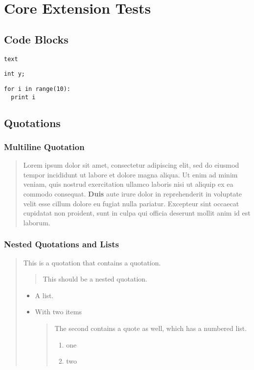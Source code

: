 
\chapter{\label{core-extension-tests}Core Extension Tests}
\section{\label{code-blocks}Code Blocks}
\begin{verbatim}
text
\end{verbatim}
\begin{verbatim}
int y;
\end{verbatim}
\begin{verbatim}
for i in range(10):
  print i
\end{verbatim}
\section{\label{quotations}Quotations}
\subsection{\label{multiline-quotation}Multiline Quotation}
\begin{quote}
\par Lorem ipsum dolor sit amet, consectetur adipiscing elit, sed do eiusmod tempor incididunt ut labore et dolore magna aliqua. Ut enim ad minim veniam, quis nostrud exercitation ullamco laboris nisi ut aliquip ex ea commodo consequat. \textbf{Duis} aute irure dolor in reprehenderit in voluptate velit esse cillum dolore eu fugiat nulla pariatur. Excepteur sint occaecat cupidatat non proident, sunt in culpa qui officia deserunt mollit anim id est laborum.
\end{quote}
\subsection{\label{nested-quotations-and-lists}Nested Quotations and Lists}
\begin{quote}
\par This is a quotation that contains a quotation.
\begin{quote}
\par This should be a nested quotation.
\end{quote}
\begin{itemize}
\item
\par A list. \item
\par With two items
\begin{quote}
\par The second contains a quote as well, which has a numbered list.
\begin{enumerate}
\item
\par one \item
\par two
\end{enumerate}
\end{quote}
\end{itemize}
\end{quote}
